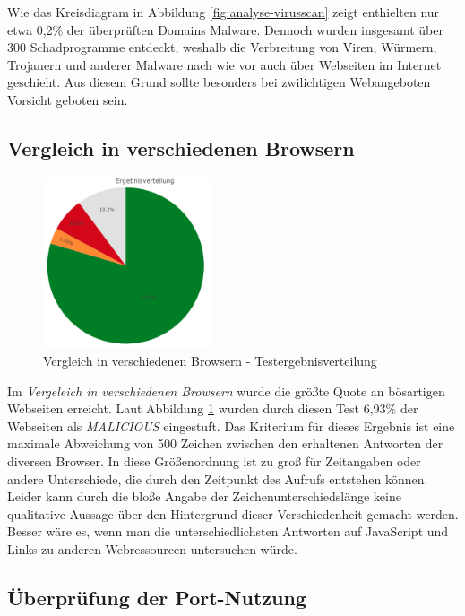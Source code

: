 Wie das Kreisdiagram in Abbildung \ref{fig:analyse-virusscan} zeigt enthielten nur etwa 0,2\% der überprüften Domains Malware. Dennoch wurden insgesamt über 300 Schadprogramme entdeckt, weshalb die Verbreitung von Viren, Würmern, Trojanern und anderer Malware nach wie vor auch über Webseiten im Internet geschieht. Aus diesem Grund sollte besonders bei zwilichtigen Webangeboten Vorsicht geboten sein.

\subsection{Vergleich in verschiedenen Browsern}
\begin{figure}[H]
  \centering
  \includegraphics[width=5cm]{images/stats/diaheaderinspection}
  \caption{Vergleich in verschiedenen Browsern - Testergebnisverteilung}
  \label{fig:analyse-diaheaderinspection}
\end{figure}

Im \textit{Vergeleich in verschiedenen Browsern} wurde die größte Quote an bösartigen Webseiten
erreicht. Laut Abbildung \ref{fig:analyse-diaheaderinspection} wurden durch diesen Test 6,93\% der
Webseiten als \textit{MALICIOUS} eingestuft. Das Kriterium für dieses Ergebnis ist eine maximale
Abweichung von 500 Zeichen zwischen den erhaltenen Antworten der diversen Browser. In diese
Größenordnung ist zu groß für Zeitangaben oder andere Unterschiede, die durch den Zeitpunkt des
Aufrufs entstehen können. Leider kann durch die bloße Angabe der Zeichenunterschiedslänge keine
qualitative Aussage über den Hintergrund dieser Verschiedenheit gemacht werden. Besser wäre es,
wenn man die unterschiedlichsten Antworten auf JavaScript und Links zu anderen Webressourcen untersuchen würde.

\subsection{Überprüfung der Port-Nutzung}


